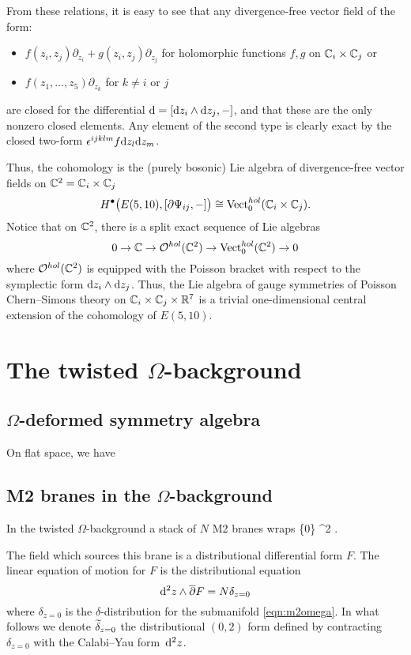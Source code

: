 \documentclass[11pt]{amsart}
\begin{document}
From these relations, it is easy to see that any divergence-free vector field of the form:
\begin{itemize}
\item $f(z_i, z_j) \partial_{z_i} + g(z_i, z_j) \partial_{z_j}$ for holomorphic functions $f,g$ on $\mathbb C_i \times \mathbb C_j$ or 
\item $f(z_1,\ldots,z_5) \partial_{z_k}$ for $k \ne i$ or $j$
\end{itemize}
are closed for the differential ${\rm d} = [{\rm d} z_i \wedge {\rm d} z_j  , -]$, and that these are the only nonzero closed elements. 
Any element of the second type is clearly exact by the closed two-form $\epsilon^{ijklm} f {\rm d} z_l {\rm d} z_m$. 

Thus, the cohomology is the (purely bosonic) Lie algebra of divergence-free vector fields on $\mathbb C^2 = \mathbb C_i \times \mathbb C_j$
\[
H^\bullet\big(E(5,10), [\partial \Psi_{ij}, -] \big) \cong {\rm Vect}^{hol}_0(\mathbb C_i \times \mathbb C_j) .
\]
Notice that on $\mathbb C^2$, there is a split exact sequence of Lie algebras
\[
0 \to \mathbb C \to \mathcal O^{hol}(\mathbb C^2) \to {\rm Vect}_0^{hol} (\mathbb C^2) \to 0
\]
where $\mathcal O^{hol}(\mathbb C^2)$ is equipped with the Poisson bracket with respect to the symplectic form ${\rm d} z_i \wedge {\rm d} z_j$.
Thus, the Lie algebra of gauge symmetries of Poisson Chern--Simons theory on $\mathbb C_i \times \mathbb C_j \times \mathbb R^7$ is a trivial one-dimensional central extension of the cohomology of $E(5,10)$. 

\section{The twisted $\Omega$-background} 

\subsection{$\Omega$-deformed symmetry algebra}

On flat space, we have 



\subsection{M2 branes in the $\Omega$-background} 

\parsec[]

In the twisted $\Omega$-background a stack of $N$ M2 branes wraps 
\beqn\label{eqn:m2omega}
\{0\} \times \RR \subset \CC^2 \times \RR .
\eeqn

The field which sources this brane is a distributional differential form $F$.
The linear equation of motion for $F$ is the distributional equation 
\[
{\rm d}^2 z \wedge \overline{\partial} F = N \delta_{z=0} 
\]
where $\delta_{z=0}$ is the $\delta$-distribution for the submanifold \eqref{eqn:m2omega}.  
In what follows we denote $\widetilde{\delta}_{z=0}$ the distributional $(0,2)$ form defined by contracting $\delta_{z=0}$ with the Calabi--Yau form~${\rm d}^2 z$. 
\end{document}
